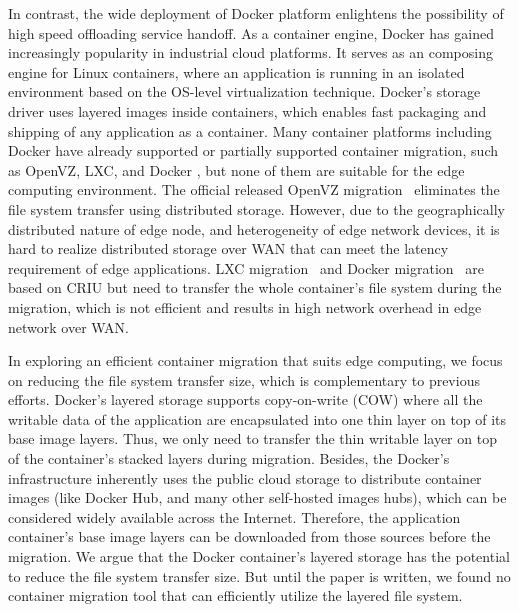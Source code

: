 In contrast, the wide deployment of Docker platform enlightens the possibility of high speed offloading service handoff. As a container engine, Docker has gained increasingly popularity in industrial cloud platforms. It serves as an composing engine for Linux containers, where an application is running in an isolated environment based on the OS-level virtualization technique.
Docker's storage driver uses layered images inside containers, which enables fast packaging and shipping of any application as a container. 
Many container platforms including Docker have already supported or partially supported container migration, such as OpenVZ\cite{openvz}, LXC\cite{qiu2016evaluating}, and Docker \cite{phaul,boucherPhaul}, but none of them are suitable for the edge computing environment. The official released OpenVZ migration~\cite{phaul} eliminates the file system transfer using distributed storage. However, due to the geographically distributed nature of edge node, and heterogeneity of edge network devices, it is hard to realize distributed storage over WAN that can meet the latency requirement of edge applications. 
LXC migration~\cite{qiu2016evaluating} and Docker migration~\cite{phaul, boucherPhaul} are based on CRIU\cite{criu} but need to transfer the whole container's file system during the migration, which is not efficient and results in high network overhead in edge network over WAN.

In exploring an efficient container migration that suits edge computing, we focus on reducing the file system transfer size, which is complementary to previous efforts.
%
Docker's layered storage supports copy-on-write (COW) where all the writable data of the application are encapsulated into one thin layer on top of its base image layers.
Thus, we only need to transfer the thin writable layer on top of the container's stacked layers during migration. Besides, the Docker's infrastructure inherently uses the public cloud storage to distribute container images (like Docker Hub\cite{dockerhub}, and many other self-hosted images hubs), which can be considered widely available across the Internet. 
Therefore, the application container's base image layers can be downloaded from those sources before the migration. We argue that the Docker container's layered storage has the potential to reduce the file system transfer size. But until the paper is written, we found no container migration tool that can efficiently utilize the layered file system. 




